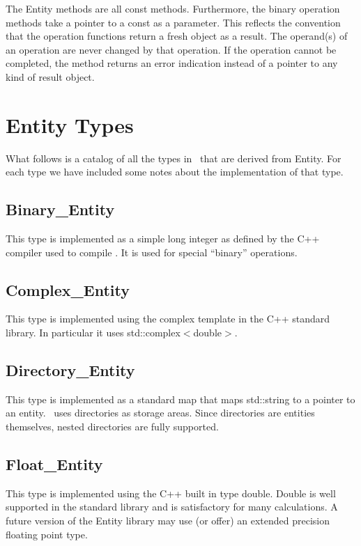 \documentclass{report}
\begin{document}
The Entity methods are all const methods. Furthermore, the binary operation methods take a
pointer to a const as a parameter. This reflects the convention that the operation functions
return a fresh object as a result. The operand(s) of an operation are never changed by that
operation. If the operation cannot be completed, the method returns an error indication instead
of a pointer to any kind of result object.

\section{Entity Types}

What follows is a catalog of all the types in \CLAC\ that are derived from Entity. For each type
we have included some notes about the implementation of that type.

\subsection{Binary\_Entity}

This type is implemented as a simple long integer as defined by the C++ compiler used to compile
\CLAC. It is used for special ``binary'' operations.

\subsection{Complex\_Entity}

This type is implemented using the complex template in the C++ standard library. In particular
it uses std::complex$<$double$>$.

\subsection{Directory\_Entity}

This type is implemented as a standard map that maps std::string to a pointer to an entity.
\CLAC\ uses directories as storage areas. Since directories are entities themselves, nested
directories are fully supported.

\subsection{Float\_Entity}

This type is implemented using the C++ built in type double. Double is well supported in the
standard library and is satisfactory for many calculations. A future version of the Entity
library may use (or offer) an extended precision floating point type.
\end{document}
